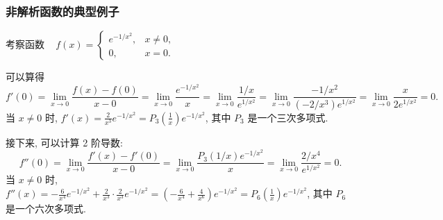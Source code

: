 
\begin{frame}
\frametitle{非解析函数的典型例子}

考察函数 ~ $f(x) = \begin{cases} e^{-1/x^2}, & x \neq 0, \\ 0, & x = 0. \end{cases}$

\pause
\vspace{0.5em}

可以算得
\[
f'(0) = \lim_{x \to 0} \frac{f(x) - f(0)}{x - 0} = \lim_{x \to 0} \frac{e^{-1/x^2}}{x} = \lim_{x \to 0} \frac{1/x}{e^{1/x^2}} = \lim_{x \to 0} \frac{-1/x^2}{(-2/x^3) e^{1/x^2}} = \lim_{x \to 0} \frac{x}{2 e^{1/x^2}} = 0.
\]
当 $x \neq 0$ 时, $f'(x) = \frac{2}{x^3} e^{-1/x^2} = P_3 \left(\frac{1}{x}\right) e^{-1/x^2}$, 其中 $P_3$ 是一个三次多项式.

\pause
\vspace{0.5em}

接下来, 可以计算 2 阶导数:
\[
f''(0) = \lim_{x \to 0} \frac{f'(x) - f'(0)}{x - 0} = \lim_{x \to 0} \frac{P_3(1/x) e^{-1/x^2}}{x} = \lim_{x \to 0} \frac{2 / x^4}{e^{1/x^2}} = 0.
\]
当 $x \neq 0$ 时, $f''(x) = -\frac{6}{x^4} e^{-1/x^2} + \frac{2}{x^3} \cdot \frac{2}{x^3} e^{-1/x^2} = \left(-\frac{6}{x^4} + \frac{4}{x^6}\right) e^{-1/x^2} = P_6 \left(\frac{1}{x}\right) e^{-1/x^2}$, 其中 $P_6$ 是一个六次多项式.

\end{frame}


